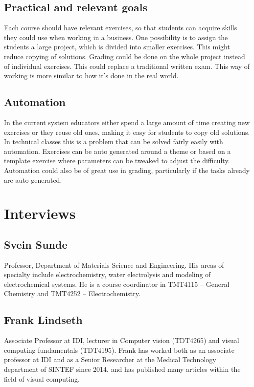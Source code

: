 \documentclass{article}
\begin{document}
\subsection{Practical and relevant goals}
Each course should have relevant exercises, so that students can acquire skills they could use when working in a business. One possibility is to assign the students a large project, which is divided into smaller exercises. This might reduce copying of solutions. Grading could be done on the whole project instead of individual exercises. This could replace a traditional written exam. This way of working is more similar to how it's done in the real world.

\subsection{Automation}
In the current system educators either spend a large amount of time creating new exercises or they reuse old ones, making it easy for students to copy old solutions. In technical classes this is a problem that can be solved fairly easily with automation. Exercises can be auto generated around a theme or based on a template exercise where parameters can be tweaked to adjust the difficulty. Automation could also be of great use in grading, particularly if the tasks already are auto generated.

\section{Interviews}
\subsection{Svein Sunde}
Professor, Department of Materials Science and Engineering. His areas of specialty include electrochemistry, water electrolysis and modeling of electrochemical systems. He is a course coordinator in TMT4115 -- General Chemistry and TMT4252 -- Electrochemistry.

\subsection{Frank Lindseth}
Associate Professor at IDI, lecturer in Computer vision (TDT4265) and visual computing fundamentals (TDT4195). Frank has worked both as an associate professor at IDI and as a Senior Researcher at the Medical Technology department of SINTEF since 2014, and has published many articles within the field of visual computing.
\end{document}
